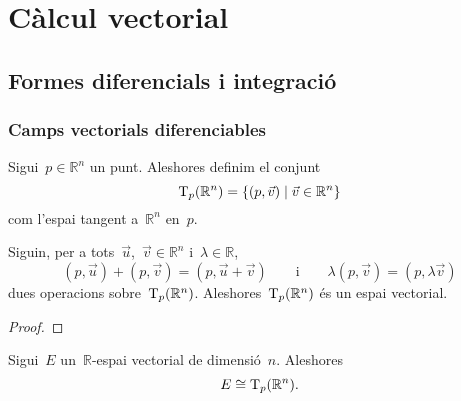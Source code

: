 \documentclass[../../main.tex]{subfiles}
\begin{document}

\chapter{Càlcul vectorial}
\section{Formes diferencials i integració}
    \subsection{Camps vectorials diferenciables}
    \begin{definition}
        \label{def:espai-tangent-a-Rn}
        Sigui~\(p\in\mathbb{R}^{n}\) un punt.
        Aleshores definim el conjunt
        \begin{equation*}
            \operatorname{T}_{p}(\mathbb{R}^{n})=\{(p,\vec{v})\mid\vec{v}\in\mathbb{R}^{n}\}
        \end{equation*}
        com l'espai tangent a~\(\mathbb{R}^{n}\) en~\(p\).
    \end{definition}
    \begin{proposition}
        \label{prop:lespai-tangent-a-Rn-es-un-espai-vectorial}
        Siguin, per a tots~\(\vec{u}\),~\(\vec{v}\in\mathbb{R}^{n}\) i~\(\lambda\in\mathbb{R}\),
        \begin{equation*}
            (p,\vec{u})+(p,\vec{v})=(p,\vec{u}+\vec{v})
            \qquad\text{i}\qquad
            \lambda(p,\vec{v})=(p,\lambda\vec{v})
        \end{equation*}
        dues operacions sobre~\(\operatorname{T}_{p}(\mathbb{R}^{n})\).
        Aleshores~\(\operatorname{T}_{p}(\mathbb{R}^{n})\) és un espai vectorial.
    \end{proposition}
    \begin{proof}
    \end{proof}
    \begin{observation}
        \label{prop:lespai-tangent-a-Rn-es-isomorf-a-un-R-espai-vectorial-de-dimensio-n}
        Sigui~\(E\) un~\(\mathbb{R}\)-espai vectorial de dimensió~\(n\).
        Aleshores
        \begin{equation*}
            E\cong\operatorname{T}_{p}(\mathbb{R}^{n}).
        \end{equation*}
    \end{observation}
\end{document}
